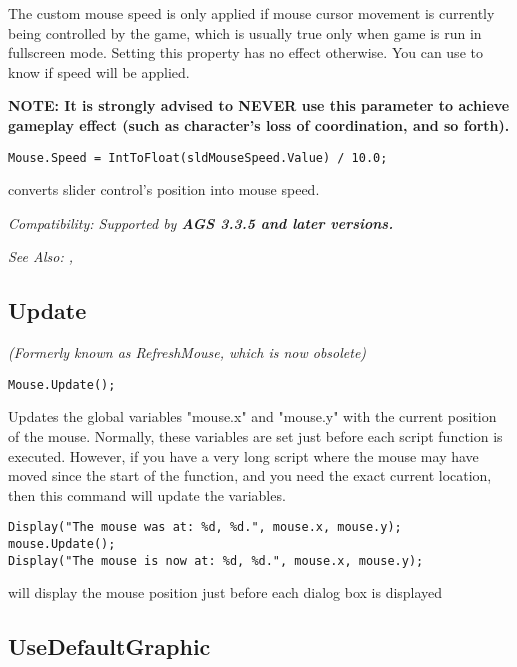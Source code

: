 The custom mouse speed is only applied if mouse cursor movement is currently being controlled by the game, which is usually true only when game is run in fullscreen mode.
Setting this property has no effect otherwise.
You can use  to know if speed will be applied.

\bf{NOTE:} It is strongly advised to \bf{NEVER} use this parameter to achieve gameplay effect (such as character's loss of coordination, and so forth).

\begin{verbatim}
Mouse.Speed = IntToFloat(sldMouseSpeed.Value) / 10.0;
\end{verbatim}
converts slider control's position into mouse speed.

\it{Compatibility:} Supported by \bf{AGS 3.3.5} and later versions.

\it{See Also:} ,


\subsection{Update}\label{Mouse.Update}%

\it{(Formerly known as RefreshMouse, which is now obsolete)}

\begin{verbatim}
Mouse.Update();
\end{verbatim}
Updates the global variables "mouse.x" and "mouse.y" with the current
position of the mouse. Normally, these variables are set just before each
script function is executed. However, if you have a very long script where
the mouse may have moved since the start of the function, and you need the
exact current location, then this command will update the variables.

\begin{verbatim}
Display("The mouse was at: %d, %d.", mouse.x, mouse.y);
mouse.Update();
Display("The mouse is now at: %d, %d.", mouse.x, mouse.y);
\end{verbatim}
will display the mouse position just before each dialog box is displayed


\subsection{UseDefaultGraphic}\label{Mouse.UseDefaultGraphic}%

